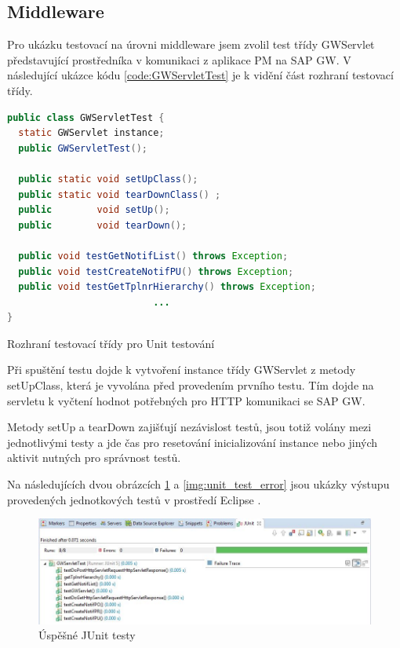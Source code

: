 \documentclass[thesis=M,czech]{FITthesis}[2012/06/26]
\begin{document}
\subsection{Middleware}
Pro ukázku testovací na úrovni middleware jsem zvolil test třídy GWServlet představující prostředníka v komunikaci z aplikace PM na SAP GW.  V následující ukázce kódu \ref{code:GWServletTest} je k vidění část rozhraní testovací třídy. 
\begin{algorithm}[H]
	\begin{lstlisting}[language=java]   
public class GWServletTest {
  static GWServlet instance;	
  public GWServletTest();
	
  public static void setUpClass();
  public static void tearDownClass() ;
  public        void setUp();
  public        void tearDown();
	
  public void testGetNotifList() throws Exception;
  public void testCreateNotifPU() throws Exception;
  public void testGetTplnrHierarchy() throws Exception;
                          ...
}
	\end{lstlisting}
	\caption{Rozhraní testovací třídy pro Unit testování}	
	\label{code:GWServletTest}
\end{algorithm}

Při spuštění testu dojde k vytvoření instance třídy GWServlet z metody setUpClass, která je vyvolána před provedením prvního testu. Tím dojde na servletu k vyčtení hodnot potřebných pro HTTP komunikaci se SAP GW.

Metody setUp a tearDown zajišťují nezávislost testů, jsou totiž volány mezi jednotlivými testy a jde čas pro resetování inicializování instance nebo jiných aktivit nutných pro správnost testů. 

Na následujících dvou obrázcích \ref{img:unit_test_success} a \ref{img:unit_test_error} jsou ukázky výstupu provedených jednotkových testů v prostředí Eclipse \cite{eclipse}.	

\begin{figure}[H]
	\centering
	\includegraphics[width=1\textwidth]{images/unit_test_success}
	\caption{Úspěšné JUnit testy}
	\label{img:unit_test_success}
\end{figure}
\end{document}
